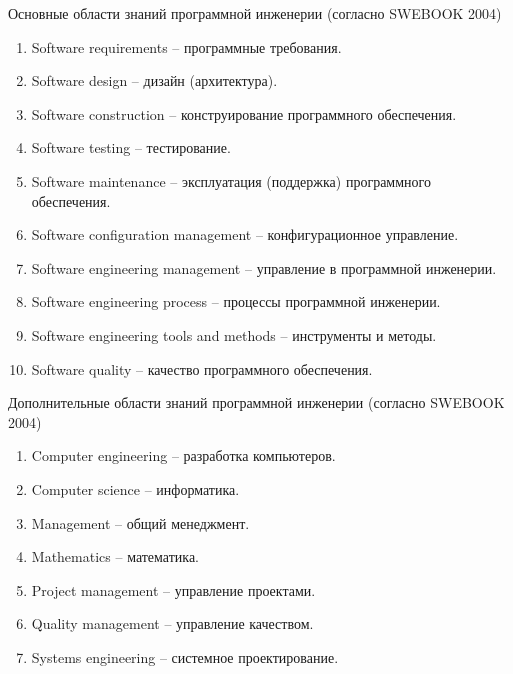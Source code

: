 \documentclass{beamer}
\begin{document}
\begin{frame}[t]
Основные области знаний программной инженерии (согласно SWEBOOK 2004)
\begin{enumerate}
\item Software requirements – программные требования.
\item Software design – дизайн (архитектура).
\item Software construction – конструирование программного обеспечения.
\item Software testing – тестирование.
\item Software maintenance – эксплуатация (поддержка) программного обеспечения.
\item Software configuration management – конфигурационное управление.
\item Software engineering management – управление в программной
инженерии.
\item Software engineering process – процессы программной инженерии.
\item Software engineering tools and methods – инструменты и методы.
\item Software quality – качество программного обеспечения.
\end{enumerate}
\end{frame} 

\begin{frame}[t]
Дополнительные области знаний программной инженерии (согласно SWEBOOK 2004)
\begin{enumerate}
\item Computer engineering – разработка компьютеров.
\item Computer science – информатика.
\item Management – общий менеджмент.
\item Mathematics – математика.
\item Project management – управление проектами.
\item Quality management – управление качеством.
\item Systems engineering – системное проектирование.
\end{enumerate}
\end{frame} 
\end{document}
